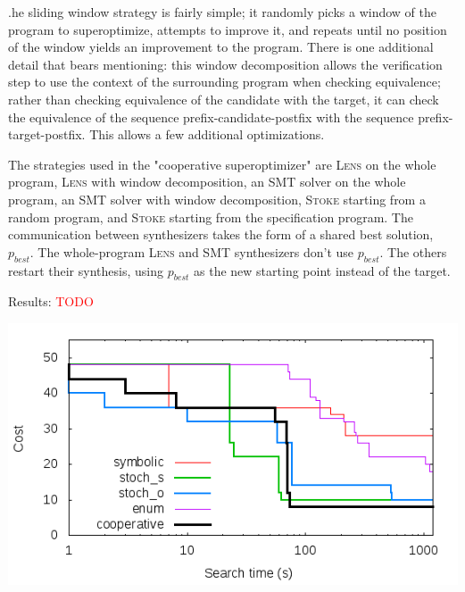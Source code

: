 \documentclass[12pt,twoside]{reedthesis}
\newcommand{\red}[1]{\textcolor{red}{#1}}
\begin{document}
.he sliding window strategy is fairly simple; it randomly picks a window of the program to superoptimize, attempts to improve it, and repeats until no position of the window yields an improvement to the program.
There is one additional detail that bears mentioning: 
this window decomposition allows the verification step to use the context of the surrounding program when checking equivalence; rather than checking equivalence of the candidate with the target, it can check the equivalence of the sequence prefix-candidate-postfix with the sequence prefix-target-postfix.
This allows a few additional optimizations.

The strategies used in the "cooperative superoptimizer" are
    \textsc{Lens} on the whole program,
    \textsc{Lens} with window decomposition,
    an SMT solver on the whole program,
    an SMT solver with window decomposition,
    \textsc{Stoke} starting from a random program, and
    \textsc{Stoke} starting from the specification program.
The communication between synthesizers takes the form of a shared best solution, $p_{best}$.
The whole-program \textsc{Lens} and SMT synthesizers don't use $p_{best}$. The others restart their synthesis, using $p_{best}$ as the new starting point instead of the target.

Results: \red{TODO}

\includegraphics[scale=0.5]{scaling}


\end{document}
